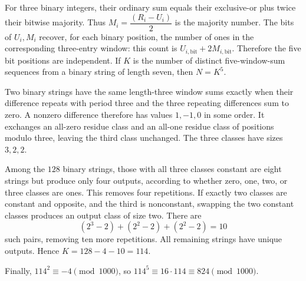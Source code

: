 For three binary integers, their ordinary sum equals their exclusive-or plus twice their bitwise majority. Thus $M_i=\dfrac{(R_i-U_i)}{2}$ is the majority number. The bits of $U_i,M_i$ recover, for each binary position, the number of ones in the corresponding three-entry window: this count is $U_{i,\text{bit}}+2M_{i,\text{bit}}$. Therefore the five bit positions are independent. If $K$ is the number of distinct five-window-sum sequences from a binary string of length seven, then $N=K^5$.

Two binary strings have the same length-three window sums exactly when their difference repeats with period three and the three repeating differences sum to zero. A nonzero difference therefore has values $1,-1,0$ in some order. It exchanges an all-zero residue class and an all-one residue class of positions modulo three, leaving the third class unchanged. The three classes have sizes $3,2,2$.

Among the $128$ binary strings, those with all three classes constant are eight strings but produce only four outputs, according to whether zero, one, two, or three classes are ones. This removes four repetitions. If exactly two classes are constant and opposite, and the third is nonconstant, swapping the two constant classes produces an output class of size two. There are
\[
(2^3-2)+(2^2-2)+(2^2-2)=10
\]
such pairs, removing ten more repetitions. All remaining strings have unique outputs. Hence $K=128-4-10=114$.

Finally, $114^2\equiv-4\pmod{1000}$, so $114^5\equiv16\cdot114\equiv\boxed{824}\pmod{1000}$.

